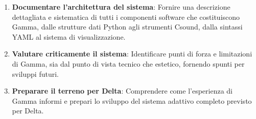 \begin{enumerate}
    \item \textbf{Documentare l'architettura del sistema}: Fornire una descrizione dettagliata e sistematica di tutti i componenti software che costituiscono Gamma, dalle strutture dati Python agli strumenti Csound, dalla sintassi YAML al sistema di visualizzazione.
    \item \textbf{Valutare criticamente il sistema}: Identificare punti di forza e limitazioni di Gamma, sia dal punto di vista tecnico che estetico, fornendo spunti per sviluppi futuri.
    \item \textbf{Preparare il terreno per Delta}: Comprendere come l'esperienza di Gamma informi e prepari lo sviluppo del sistema adattivo completo previsto per Delta.
\end{enumerate}